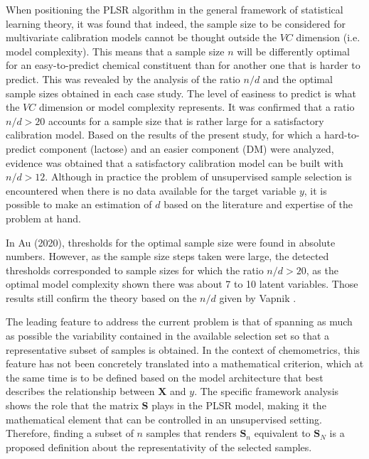 \documentclass[journal=ancham,manuscript=article]{achemso}
\begin{document}
When positioning the PLSR algorithm in the general framework of statistical learning theory, it was found that indeed, the sample size to be considered for multivariate calibration models cannot be thought outside the $VC$ dimension (i.e. model complexity). This means that a sample size $n$ will be differently optimal for an easy-to-predict chemical constituent than for another one that is harder to predict. This was revealed by the analysis of the ratio $n/d$ and the optimal sample sizes obtained in each case study. The level of easiness to predict is what the $VC$ dimension or model complexity represents. It was confirmed that a ratio $n/d>20$ accounts for a sample size that is rather large for a satisfactory calibration model. Based on the results of the present study, for which a hard-to-predict component (lactose) and an easier component (DM) were analyzed, evidence was obtained that a satisfactory calibration model can be built with $n/d>12$. Although in practice the problem of unsupervised sample selection is encountered when there is no data available for the target variable $y$, it is possible to make an estimation of $d$ based on the literature and expertise of the problem at hand.

In Au (2020)\cite{Au2020}, thresholds for the optimal sample size were found in absolute numbers. However, as the sample size steps taken were large, the detected thresholds corresponded to sample sizes for which the ratio $n/d>20$, as the optimal model complexity shown there was about 7 to 10 latent variables. Those results still confirm the theory based on the $n/d$ given by Vapnik \cite{Vapnik2000}.

The leading feature to address the current problem is that of spanning as much as possible the variability contained in the available selection set so that a representative subset of samples is obtained. In the context of chemometrics, this feature has not been concretely translated into a mathematical criterion, which at the same time is to be defined based on the model architecture that best describes the relationship between $\mathbf{X}$ and $y$. The specific framework analysis shows the role that the matrix $\mathbf{S}$ plays in the PLSR model, making it the mathematical element that can be controlled in an unsupervised setting. Therefore, finding a subset of $n$ samples that renders $\mathbf{S}_n$ equivalent to $\mathbf{S}_N$ is a proposed definition about the representativity of the selected samples. 
\end{document}
